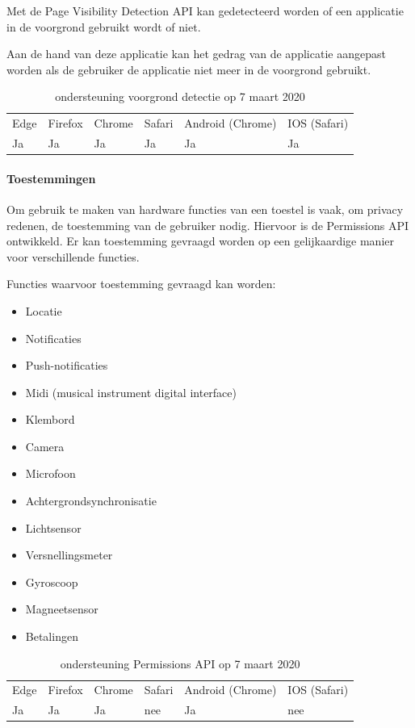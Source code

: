 Met de Page Visibility Detection API \autocite{Grigorik2017} kan gedetecteerd worden of een applicatie in de voorgrond gebruikt wordt of niet. 

Aan de hand van deze applicatie kan het gedrag van de applicatie aangepast worden als de gebruiker de applicatie niet meer in de voorgrond gebruikt.

\begin{table}[H]
	\centering
	\begin{tabular}{llllll}
		Edge & Firefox & Chrome & Safari & Android (Chrome) & IOS (Safari) \\
		Ja   & Ja      &  Ja     & Ja     & Ja               & Ja          
	\end{tabular}	
	\caption{ondersteuning voorgrond detectie op 7 maart 2020}
\end{table}


\paragraph{Toestemmingen}

Om gebruik te maken van hardware functies van een toestel is vaak, om privacy redenen, de toestemming van de gebruiker nodig. Hiervoor is de Permissions API \autocite{Caceres2017} ontwikkeld. Er kan toestemming gevraagd worden op een gelijkaardige manier voor verschillende functies.

Functies waarvoor toestemming gevraagd kan worden:
 \begin{itemize}
	\item	Locatie
	\item	Notificaties
	\item	Push-notificaties
	\item	Midi (musical instrument digital interface)
	\item	Klembord
	\item	Camera
	\item	Microfoon
	\item	Achtergrondsynchronisatie
	\item	Lichtsensor
	\item	Versnellingsmeter
	\item	Gyroscoop
	\item	Magneetsensor
	\item	Betalingen
\end{itemize}

	\begin{table}[H]
		\centering
		\begin{tabular}{llllll}
			Edge & Firefox & Chrome & Safari & Android (Chrome) & IOS (Safari) \\
			Ja   & Ja      &  Ja     & nee     & Ja               & nee          
		\end{tabular}	
		\caption{ondersteuning Permissions API op 7 maart 2020}
	\end{table}
	

